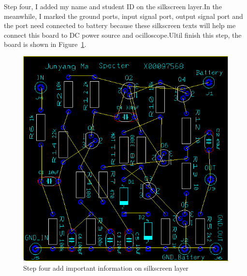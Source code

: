 Step four, I added my name and student ID on the silkscreen layer.In the meanwhile, I marked the ground ports, input signal port, output signal port and the port need connected to battery because these silkscreen texts will help me connect this board to DC power source and ocilloscope.Ultil finish this step, the board is shown in Figure~\ref{fig:Step four add important information on silkscreen layer}.
 
\begin{figure}[htbp]
	\centering
	\includegraphics[scale=0.7]{"../Photo/Chap6/final PCB not rout"}
	\caption{Step four add important information on silkscreen layer }
	\label{fig:Step four add important information on silkscreen layer}
\end{figure}

